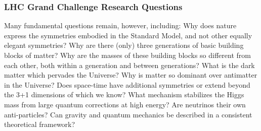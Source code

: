 \begin{frame}
\frametitle{LHC Grand Challenge Research Questions}

Many fundamental questions remain, however, including: Why does nature express the symmetries embodied in the Standard Model, and not other equally elegant symmetries? Why are there (only) three generations of basic building blocks of matter? Why are the masses of these building blocks so different from each other, both within a generation and between generations? What is the dark matter which pervades the Universe? Why is matter so dominant over antimatter in the Universe? Does space-time have additional symmetries or extend beyond the 3+1 dimensions of which we know? What mechanism stabilizes the Higgs mass from large quantum corrections at high energy? Are neutrinos their own anti-particles? Can gravity and quantum mechanics be described in a consistent theoretical framework?

\end{frame}


